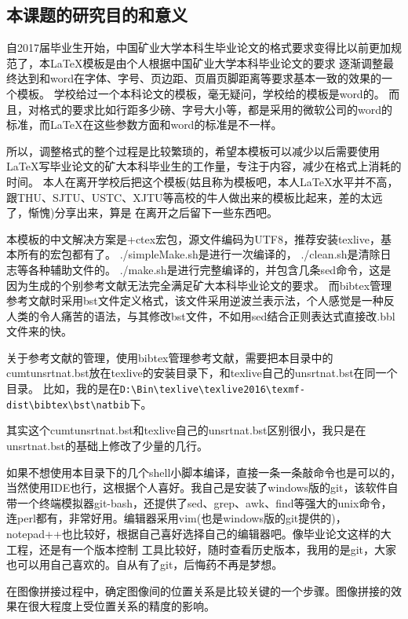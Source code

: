 \documentclass[10.5pt,a4paper]{article}
\numberwithin{equation}{section}
\numberwithin{figure}{section}
\numberwithin{table}{section}
\begin{document}
\subsection{本课题的研究目的和意义}
自2017届毕业生开始，中国矿业大学本科生毕业论文的格式要求变得比以前更加规范了，本\LaTeX{}模板是由个人根据中国矿业大学本科毕业论文的要求%
逐渐调整最终达到和word在字体、字号、页边距、页眉页脚距离等要求基本一致的效果的一个模板。
学校给过一个本科论文的模板，毫无疑问，学校给的模板是word的。
而且，对格式的要求比如行距多少磅、字号大小等，都是采用的微软公司的word的标准，而\LaTeX{}在这些参数方面和word的标准是不一样。
\par
所以，调整格式的整个过程是比较繁琐的，希望本模板可以减少以后需要使用\LaTeX{}写毕业论文的矿大本科毕业生的工作量，专注于内容，减少在格式上消耗的时间。
本人在离开学校后把这个模板(姑且称为模板吧，本人\LaTeX{}水平并不高，跟THU、SJTU、USTC、XJTU等高校的牛人做出来的模板比起来，差的太远了，惭愧)分享出来，算是%
在离开之后留下一些东西吧。
\par
本模板的中文解决方案是\XeLaTeX{}+ctex宏包，源文件编码为UTF8，推荐安装texlive，基本所有的宏包都有了。
./simpleMake.sh是进行一次编译的， ./clean.sh是清除日志等各种辅助文件的。
./make.sh是进行完整编译的，并包含几条sed命令，这是因为生成的个别参考文献无法完全满足矿大本科毕业论文的要求。
而bibtex管理参考文献时采用bst文件定义格式，该文件采用逆波兰表示法，个人感觉是一种反人类的令人痛苦的语法，与其修改bst文件，不如用sed结合正则表达式直接改.bbl文件来的快。\par
关于参考文献的管理，使用bibtex管理参考文献，需要把本目录中的cumtunsrtnat.bst放在texlive的安装目录下，和texlive自己的unsrtnat.bst在同一个目录。
比如，我的是在\verb|D:\Bin\texlive\texlive2016\texmf-dist\bibtex\bst\natbib|下。\par
其实这个cumtunsrtnat.bst和texlive自己的unsrtnat.bst区别很小，我只是在unsrtnat.bst的基础上修改了少量的几行。
\par
如果不想使用本目录下的几个shell小脚本编译，直接一条一条敲命令也是可以的，当然使用IDE也行，这根据个人喜好。我自己是安装了windows版的git，该软件自
带一个终端模拟器git-bash，还提供了sed、grep、awk、find等强大的unix命令，连perl都有，非常好用。编辑器采用vim(也是windows版的git提供的)，notepad++也比较好，根据自己喜好选择自己的编辑器吧。像毕业论文这样的大工程，还是有一个版本控制
工具比较好，随时查看历史版本，我用的是git，大家也可以用自己喜欢的。自从有了git，后悔药不再是梦想。
\par
在图像拼接过程中，确定图像间的位置关系是比较关键的一个步骤。图像拼接的效果在很大程度上受位置关系的精度的影响\cite{zagrouba2009efficient,chen2014optimization}。\par
\end{document}
